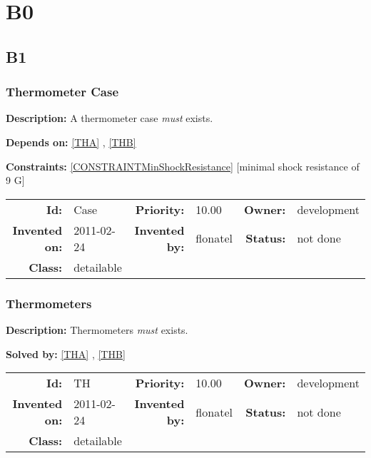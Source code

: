 \chapter{B0}
\section{B1}
\subsection{Thermometer Case}\label{Case}
\textbf{Description:} A thermometer case \textsl{must} exists.

\textbf{Depends on:} \ref{THA} , \ref{THB} 

\textbf{Constraints:} \ref{CONSTRAINTMinShockResistance}  [minimal shock resistance of 9 G] 

\par
{\small \begin{center}\begin{tabular}{rlrlrl}
\textbf{Id:} & Case  & \textbf{Priority:} & 10.00  & \textbf{Owner:} & development\\ 
\textbf{Invented on:} & 2011-02-24  & \textbf{Invented by:} & flonatel  & \textbf{Status:} & not done \\ 
\textbf{Class:} & detailable  & & & \end{tabular}\end{center} }

\subsection{Thermometers}\label{TH}
\textbf{Description:} Thermometers \textsl{must} exists.

\textbf{Solved by:} \ref{THA} , \ref{THB} 

\par
{\small \begin{center}\begin{tabular}{rlrlrl}
\textbf{Id:} & TH  & \textbf{Priority:} & 10.00  & \textbf{Owner:} & development\\ 
\textbf{Invented on:} & 2011-02-24  & \textbf{Invented by:} & flonatel  & \textbf{Status:} & not done \\ 
\textbf{Class:} & detailable  & & & \end{tabular}\end{center} }

